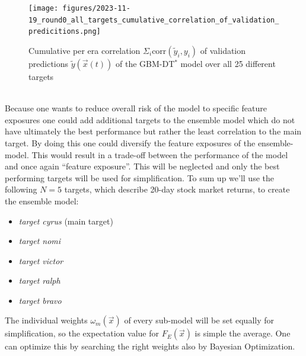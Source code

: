 \documentclass[12pt, a4paper]{article}
\begin{document}
\begin{figure}[!htpb]
    \centering
    \texttt{[image: figures/2023-11-19\_round0\_all\_targets\_cumulative\_correlation\_of\_validation\_predicitions.png]}
    \caption[Cumulative per era correlation of validation predictions over the GBM-DT$^{\ast}$ models over all different targets]{Cumulative per era correlation $\Sigma_i \text{corr}(\tilde{y}_i,y_i)$ of validation predictions $\tilde{y}(\vec{x}(t))$ of the GBM-DT$^{\ast}$ model over all 25 different targets}
    \label{fig: cum_corr_val_preds_all_targets}
\end{figure}
\\
Because one wants to reduce overall risk of the model to specific feature exposures one could add additional targets to the ensemble model which do not have ultimately the best performance but rather the least correlation to the main target. By doing this one could diversify the feature exposures of the ensemble-model. This would result in a trade-off between the performance of the model and once again ``feature exposure''. This will be neglected and only the best performing targets will be used for simplification.
To sum up we'll use the following $N = 5$ targets, which describe 20-day stock market returns, to create the ensemble model: \\
\begin{itemize}
    \item \textit{target cyrus} (main target)
    \item \textit{target nomi}
    \item \textit{target victor}
    \item \textit{target ralph}
    \item \textit{target bravo}
\end{itemize}
The individual weights $\omega_m(\vec{x})$ of every sub-model will be set equally for simplification, so the expectation value for $F_E(\vec{x})$ is simple the average. One can optimize this by searching the right weights also by Bayesian Optimization. \\
\end{document}

